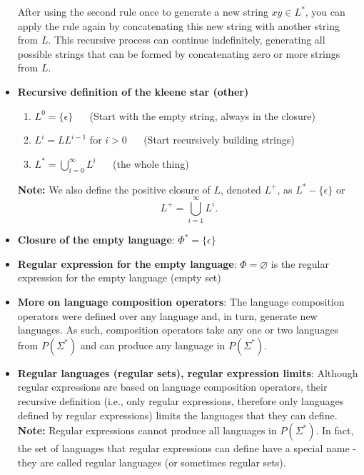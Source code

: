 \documentclass{report}
\begin{document}
\begin{itemize}
            \bigbreak \noindent 
            After using the second rule once to generate a new string \( xy \in L^* \), you can apply the rule again by concatenating this new string with another string from \( L \). This recursive process can continue indefinitely, generating all possible strings that can be formed by concatenating zero or more strings from \( L \).
        \item \textbf{Recursive definition of the kleene star (other)}
            \begin{enumerate}
                \item $L^{0} = \{\epsilon\}$ $\quad$ (Start with the empty string, always in the closure)
                \item $L^{i}=LL^{i-1}$ for $i>0$ $\quad$ (Start recursively building strings)
                \item $L^{*} = \bigcup_{i=0}^{\infty} L^{i}$ $\quad$ (the whole thing)
            \end{enumerate}
            \bigbreak \noindent 
            \textbf{Note:} We also define the positive closure of \( L \), denoted \( L^+ \), as \( L^* - \{\epsilon\} \) or
            \[
                L^+ = \bigcup_{i=1}^{\infty} L^i.
            \]
        \item \textbf{Closure of the empty language}: $\Phi^{*} = \{\epsilon\} $
        \item \textbf{Regular expression for the empty language}: $\Phi  = \varnothing$  is the regular expression for the empty language (empty set)
        \item \textbf{More on language composition operators}:
            The language composition operators were defined over any language and, in turn, generate new languages. As such, composition operators take any one or two languages from $P(\Sigma^{*})$ and can produce any language in $P(\Sigma^{*})$.
        \item \textbf{Regular languages (regular sets), regular expression limits}: Although regular expressions are based on language composition operators, their recursive definition (i.e., only regular expressions, therefore only languages defined by regular expressions) limits the languages that they can define.
            \bigbreak \noindent 
            \textbf{Note:} Regular expressions cannot produce all languages in $P(\Sigma^{*})$.
            \bigbreak \noindent 
            In fact, the set of languages that regular expressions can define have a special name - they are called regular languages (or sometimes regular sets).


\end{itemize}
\end{document}
